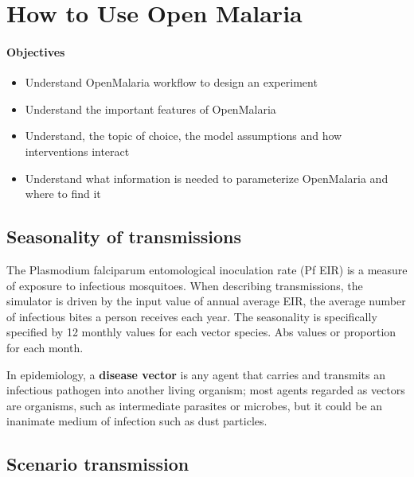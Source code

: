 \documentclass[]{scrartcl}
\begin{document}
\section{How to Use Open Malaria}

\paragraph*{Objectives}
\begin{itemize}
	\item Understand OpenMalaria workflow to design an experiment
	\item Understand the important features of OpenMalaria
	\item Understand, the topic of choice, the model assumptions and how interventions interact 
	\item Understand what information is needed to parameterize OpenMalaria and where to find it
\end{itemize}
 

\subsection{Seasonality of transmissions}
The Plasmodium falciparum entomological inoculation rate (Pf EIR) is a measure of exposure to infectious mosquitoes. 
When describing transmissions, the simulator is driven by the input value of annual average EIR, the average number of infectious bites a person receives each year.
The seasonality is specifically specified by 12 monthly values for each vector species. Abs values or proportion for each month.

In epidemiology, a \textbf{disease vector} is any agent that carries and transmits an infectious pathogen into another living organism; most agents regarded as vectors are organisms, such as intermediate parasites or microbes, but it could be an inanimate medium of infection such as dust particles.

\subsection{Scenario transmission}
\end{document}
